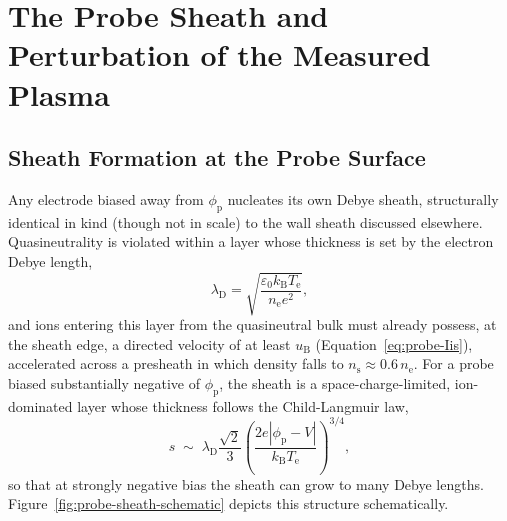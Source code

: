 \section{The Probe Sheath and Perturbation of the Measured Plasma}
\label{sec:probes-sheath-perturbation}

\subsection{Sheath Formation at the Probe Surface}

Any electrode biased away from $\phi_{\mathrm{p}}$ nucleates its own Debye sheath, structurally identical in kind (though not in scale) to the wall sheath discussed elsewhere. Quasineutrality is violated within a layer whose thickness is set by the electron Debye length,
\begin{equation}
\lambda_{\mathrm{D}} = \sqrt{\frac{\varepsilon_0 k_{\mathrm{B}} T_{\mathrm{e}}}{n_{\mathrm{e}} e^2}},
\label{eq:probe-debye}
\end{equation}
and ions entering this layer from the quasineutral bulk must already possess, at the sheath edge, a directed velocity of at least $u_{\mathrm{B}}$ (Equation~\eqref{eq:probe-Iis}), accelerated across a presheath in which density falls to $n_{\mathrm{s}} \approx 0.6\,n_{\mathrm{e}}$. For a probe biased substantially negative of $\phi_{\mathrm{p}}$, the sheath is a space-charge-limited, ion-dominated layer whose thickness follows the Child-Langmuir law,
\begin{equation}
s \;\sim\; \lambda_{\mathrm{D}} \frac{\sqrt{2}}{3}\left(\frac{2e\left|\phi_{\mathrm{p}} - V\right|}{k_{\mathrm{B}} T_{\mathrm{e}}}\right)^{3/4},
\label{eq:probe-child-langmuir}
\end{equation}
so that at strongly negative bias the sheath can grow to many Debye lengths. Figure~\ref{fig:probe-sheath-schematic} depicts this structure schematically.

